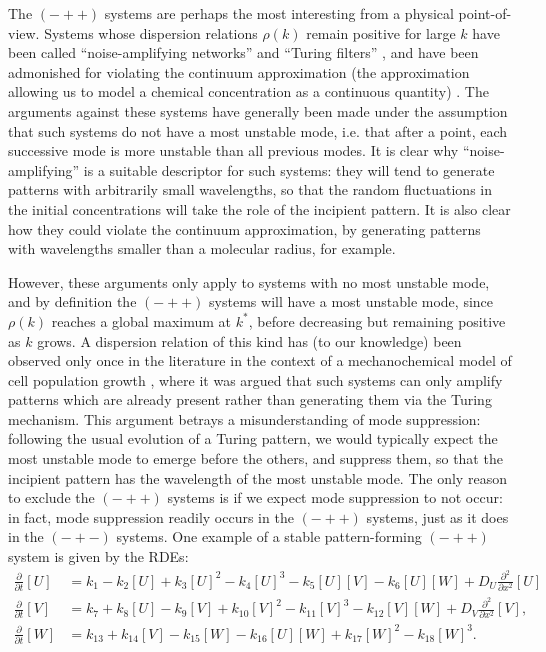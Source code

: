 The $(-++)$ systems are perhaps the most interesting from a physical point-of-view. Systems whose dispersion relations $\rho(k)$ remain positive for large $k$ have been called ``noise-amplifying networks'' \cite{marcon2016high} and ``Turing filters'' \cite{diego2017key}, and have been admonished for violating the continuum approximation (the approximation allowing us to model a chemical concentration as a continuous quantity) \cite{moreo2010modelling,klika2012influence}. The arguments against these systems have generally been made under the assumption that such systems do not have a most unstable mode, i.e. that after a point, each successive mode is more unstable than all previous modes. It is clear why ``noise-amplifying'' is a suitable descriptor for such systems: they will tend to generate patterns with arbitrarily small wavelengths, so that the random fluctuations in the initial concentrations will take the role of the incipient pattern. It is also clear how they could violate the continuum approximation, by generating patterns with wavelengths smaller than a molecular radius, for example.

However, these arguments only apply to systems with no most unstable mode, and by definition the $(-++)$ systems will have a most unstable mode, since $\rho(k)$ reaches a global maximum at $k^*$, before decreasing but remaining positive as $k$ grows. A dispersion relation of this kind has (to our knowledge) been observed only once in the literature in the context of a mechanochemical model of cell population growth \cite{manoussaki1996mechanical}, where it was argued that such systems can only amplify patterns which are already present rather than generating them via the Turing mechanism. This argument betrays a misunderstanding of mode suppression: following the usual evolution of a Turing pattern, we would typically expect the most unstable mode to emerge before the others, and suppress them, so that the incipient pattern has the wavelength of the most unstable mode. The only reason to exclude the $(-++)$ systems is if we expect mode suppression to not occur: in fact, mode suppression readily occurs in the $(-++)$ systems, just as it does in the $(-+-)$ systems. One example of a stable pattern-forming $(-++)$ system is given by the RDEs:
  \begin{align}\label{noiseamp}
    \frac{\partial}{\partial t} [U]&= k_1-k_2[U]+k_3[U]^2-k_4[U]^3-k_5[U][V]-k_6[U][W]+D_U\frac{\partial^2}{\partial x^2}[U]\\
    \frac{\partial}{\partial t} [V]&=k_7+k_8[U]-k_9[V]+k_{10}[V]^2-k_{11}[V]^3-k_{12}[V][W]+D_V\frac{\partial^2}{\partial x^2}[V],\nonumber\\
    \frac{\partial}{\partial t} [W]&=k_{13}+k_{14}[V]-k_{15}[W]-k_{16}[U][W]+k_{17}[W]^2-k_{18}[W]^3.\nonumber
  \end{align}

